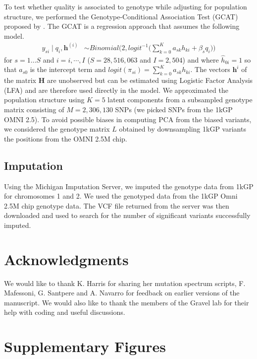 \documentclass[9pt,article]{template}
\begin{document}
To test whether quality is associated to genotype while adjusting for population structure, we performed the Genotype-Conditional Association Test  (GCAT) proposed by \citep{song2015testing}.
The GCAT is a regression approach that assumes the following model.
\begin{align}\label{gcat}
 y_{si} \mid q_i, \boldsymbol{h}^{(i)} &\sim Binomial\bigg( 2, logit^{-1}\Big( \sum_{k=0}^{K} a_{sk} h_{ki} + \beta_s q_i\Big) \bigg)
\end{align} 
for $s=1\hdots S$ and $i=i,\cdots, I$  ($S = 28,516,063$ and $I = 2,504$) and where $\hat{h}_{0i}=1$ so that $a_{s0}$ is the intercept term and $logit(\pi_{si})=\sum_{k=0}^{K} a_{sk} h_{ki}$. 
The vectors $\boldsymbol{h}^{i}$ of the matrix $\mathbf{H}$ are unobserved but can be estimated using Logistic Factor Analysis (LFA) \citep{song2015testing} and are therefore used directly in the model. 
We approximated the population structure using $K=5$ latent components from a subsampled genotype matrix consisting of $M = 2,306,130$ SNPs (we picked SNPs from the 1kGP OMNI 2.5). 
To avoid possible biases in computing PCA from the biased variants, we considered the genotype matrix $L$ obtained by downsampling 1kGP variants the positions from the OMNI 2.5M chip.

\subsection{Imputation}
Using the Michigan Imputation Server, we imputed the genotype data from 1kGP for chromosomes 1 and 2.
We used the genotyped data from the 1kGP Omni 2.5M chip genotype data.
The VCF file returned from the server was then downloaded and used to search for the number of significant variants successfully imputed. 

\section{Acknowledgments}
We would like to thank K. Harris for sharing her mutation spectrum scripts, F. Mafessoni, G. Santpere and A. Navarro for feedback on earlier versions of the manuscript.
We would also like to thank the members of the Gravel lab for their help with coding and useful discussions.



\clearpage
\section{Supplementary Figures}
\end{document}
